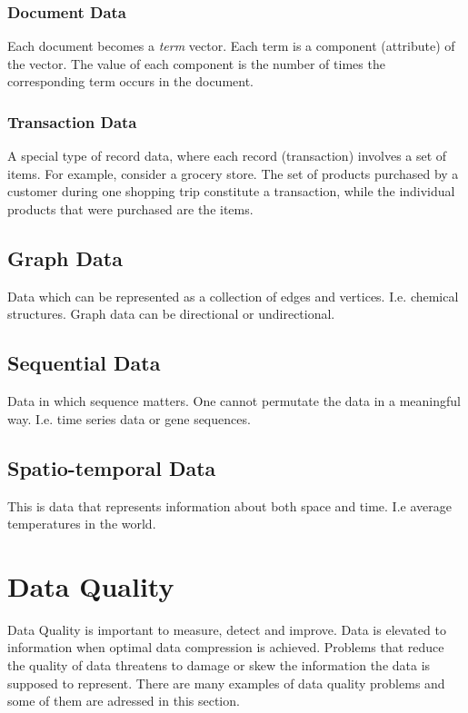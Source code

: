 \subsubsection{Document Data}
Each document becomes a \textit{term} vector.
Each term is a component (attribute) of the vector.
The value of each component is the number of times the corresponding term occurs in the document.

\subsubsection{Transaction Data}
A special type of record data, where each record (transaction) involves a set of items.
For example, consider a grocery store. The set of products purchased by a customer during one shopping trip constitute a transaction, while the individual products that were purchased are the items.

\subsection{Graph Data}
Data which can be represented as a collection of edges and vertices. 
I.e. chemical structures. Graph data can be directional or undirectional. 

\subsection{Sequential Data}
Data in which sequence matters. One cannot permutate the data in a meaningful
way. I.e. time series data or gene sequences.

\subsection{Spatio-temporal Data}
This is data that represents information about both space and time. 
I.e average temperatures in the world. 

\section{Data Quality}

Data Quality is important to measure, detect and improve. Data is elevated to 
information when optimal data compression is achieved. Problems that reduce the
quality of data threatens to damage or skew the information the data is supposed
to represent. There are many examples of data quality problems and some of them 
are adressed in this section.

